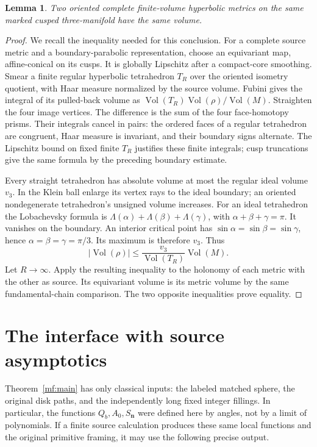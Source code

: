 \documentclass[11pt]{article}
\numberwithin{equation}{section}
\newtheorem{lemma}[theorem]{Lemma}
\theoremstyle{definition}
\theoremstyle{remark}
\newcommand{\Vol}{\operatorname{Vol}}
\begin{document}
\begin{lemma}\label{mf:volume-independence}
Two oriented complete finite-volume hyperbolic metrics on the same
marked cusped three-manifold have the same volume.
\end{lemma}
\begin{proof}
We recall the inequality needed for this conclusion.
For a complete source metric and a boundary-parabolic representation,
choose an equivariant map, affine-conical on its cusps.
It is globally Lipschitz after a compact-core smoothing.
Smear a finite regular hyperbolic tetrahedron \(T_R\) over the
oriented isometry quotient, with Haar measure normalized by the
source volume. Fubini gives the integral of its pulled-back volume
as
\(\Vol(T_R)\Vol(\rho)/\Vol(M)\).
Straighten the four image vertices. The difference is the sum of
the four face-homotopy prisms. Their integrals cancel in pairs:
the ordered faces of a regular tetrahedron are congruent, Haar
measure is invariant, and their boundary signs alternate.
The Lipschitz bound on fixed finite \(T_R\) justifies these finite
integrals; cusp truncations give the same formula by the preceding
boundary estimate.

Every straight tetrahedron has absolute volume at most the regular
ideal volume \(v_3\). In the Klein ball enlarge its vertex rays to
the ideal boundary; an oriented nondegenerate tetrahedron's unsigned
volume increases. For an ideal tetrahedron the Lobachevsky formula is
\(\Lambda(\alpha)+\Lambda(\beta)+\Lambda(\gamma)\), with
\(\alpha+\beta+\gamma=\pi\). It vanishes on the boundary.
An interior critical point has
\(\sin\alpha=\sin\beta=\sin\gamma\), hence
\(\alpha=\beta=\gamma=\pi/3\). Its maximum is therefore \(v_3\).
Thus
\[
        |\Vol(\rho)|\le
             \frac{v_3}{\Vol(T_R)}\Vol(M).
\]
Let \(R\to\infty\). Apply the resulting inequality to the holonomy
of each metric with the other as source. Its equivariant volume is
its metric volume by the same fundamental-chain comparison.
The two opposite inequalities prove equality.
\end{proof}

\section{The interface with source asymptotics}
\label{mf:interface}

Theorem~\ref{mf:main} has only classical inputs: the labeled matched
sphere, the original disk paths, and the independently long fixed
integer fillings. In particular, the functions \(Q_b,A_0,S_{\mathbf n}\)
were defined here by angles, not by a limit of polynomials.
If a finite source calculation produces these same local functions
and the original primitive framing, it may use the following precise
output.
\end{document}
